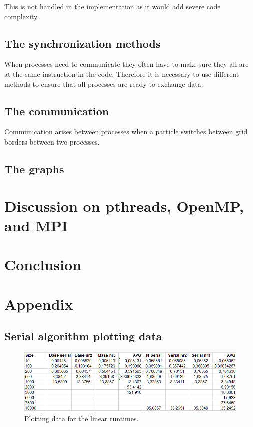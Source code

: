 \documentclass[a4paper,11pt,oneside]{book}
\begin{document}
This is not handled in the implementation as it would add severe code complexity.

\section{The synchronization methods}
When processes need to communicate they often have to make sure they all are at the same instruction in the code. Therefore it is necessary to use different methods  to ensure that all processes are ready to exchange data.

\section{The communication}
Communication arises between processes when a particle switches between grid borders between two processes.

\section{The graphs}

\chapter{Discussion on pthreads, OpenMP, and MPI}

\chapter{Conclusion}


\newpage
{}
\chapter{Appendix}
\section{Serial algorithm plotting data}

\begin{figure}[H]
  \centering
  \begin{minipage}[b]{0.9\textwidth}
    \includegraphics[width=\textwidth]{plotdata.png}
    \caption{Plotting data for the linear runtimes.}
  \end{minipage}
\end{figure}
\end{document}
